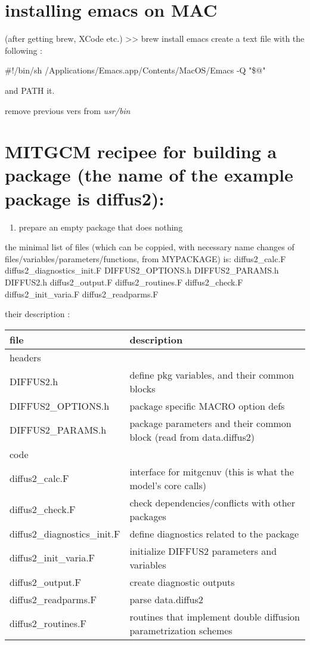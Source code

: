 \documentclass[11pt]{article}
\begin{document}
\section{installing emacs on MAC}
\label{sec-28}
(after getting brew, XCode etc.)
>> brew install emacs
create a text file with the following :

\#!/bin/sh
/Applications/Emacs.app/Contents/MacOS/Emacs -Q "\$@" 

and PATH it.

remove previous vers from \emph{usr/bin}

\section{MITGCM recipee for building a package (the name of the example package is diffus2):}
\label{sec-29}

\begin{enumerate}
\item prepare an empty package that does nothing
\end{enumerate}

the minimal list of files (which can be coppied, with necessary name changes of files/variables/parameters/functions, from MYPACKAGE) is:
diffus2\_calc.F
diffus2\_diagnostics\_init.F
DIFFUS2\_OPTIONS.h
DIFFUS2\_PARAMS.h
DIFFUS2.h
diffus2\_output.F
diffus2\_routines.F
diffus2\_check.F
diffus2\_init\_varia.F
diffus2\_readparms.F

their description :
\begin{center}
\begin{tabular}{ll}
\hline
file & description\\
\hline
headers & \\
\hline
DIFFUS2.h & define pkg variables, and their common blocks\\
DIFFUS2\_OPTIONS.h & package specific MACRO option defs\\
DIFFUS2\_PARAMS.h & package parameters and their common block  (read from data.diffus2)\\
\hline
code & \\
\hline
diffus2\_calc.F & interface for mitgcnuv (this is what the model's core calls)\\
diffus2\_check.F & check dependencies/conflicts with other packages\\
diffus2\_diagnostics\_init.F & define diagnostics related to the package\\
diffus2\_init\_varia.F & initialize DIFFUS2 parameters and variables\\
diffus2\_output.F & create diagnostic outputs\\
diffus2\_readparms.F & parse data.diffus2\\
diffus2\_routines.F & routines that implement double diffusion parametrization schemes\\
\hline
\end{tabular}
\end{center}
\end{document}
